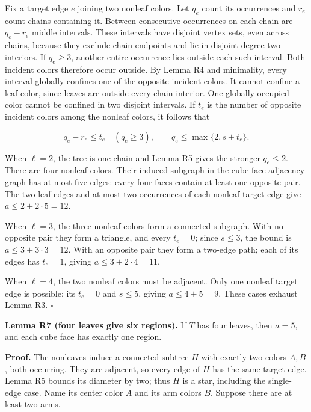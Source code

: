 \documentclass[
  11pt,
]{article}
\begin{document}
Fix a target edge \(e\) joining two nonleaf colors. Let \(q_e\) count
its occurrences and \(r_e\) count chains containing it. Between
consecutive occurrences on each chain are \(q_e-r_e\) middle intervals.
These intervals have disjoint vertex sets, even across chains, because
they exclude chain endpoints and lie in disjoint degree-two interiors.
If \(q_e\ge3\), another entire occurrence lies outside each such
interval. Both incident colors therefore occur outside. By Lemma R4 and
minimality, every interval globally confines one of the opposite
incident colors. It cannot confine a leaf color, since leaves are
outside every chain interior. One globally occupied color cannot be
confined in two disjoint intervals. If \(t_e\) is the number of opposite
incident colors among the nonleaf colors, it follows that

\[
q_e-r_e\le t_e\quad(q_e\ge3),\qquad
q_e\le\max\{2,s+t_e\}.
\]

When \(\ell=2\), the tree is one chain and Lemma R5 gives the stronger
\(q_e\le2\). There are four nonleaf colors. Their induced subgraph in
the cube-face adjacency graph has at most five edges: every four faces
contain at least one opposite pair. The two leaf edges and at most two
occurrences of each nonleaf target edge give \(a\le2+2\cdot5=12\).

When \(\ell=3\), the three nonleaf colors form a connected subgraph.
With no opposite pair they form a triangle, and every \(t_e=0\); since
\(s\le3\), the bound is \(a\le3+3\cdot3=12\). With an opposite pair they
form a two-edge path; each of its edges has \(t_e=1\), giving
\(a\le3+2\cdot4=11\).

When \(\ell=4\), the two nonleaf colors must be adjacent. Only one
nonleaf target edge is possible; its \(t_e=0\) and \(s\le5\), giving
\(a\le4+5=9\). These cases exhaust Lemma R3. \(\square\)

\textbf{Lemma R7 (four leaves give six regions).} If \(T\) has four
leaves, then \(a=5\), and each cube face has exactly one region.

\textbf{Proof.} The nonleaves induce a connected subtree \(H\) with
exactly two colors \(A,B\), both occurring. They are adjacent, so every
edge of \(H\) has the same target edge. Lemma R5 bounds its diameter by
two; thus \(H\) is a star, including the single-edge case. Name its
center color \(A\) and its arm colors \(B\). Suppose there are at least
two arms.
\end{document}
